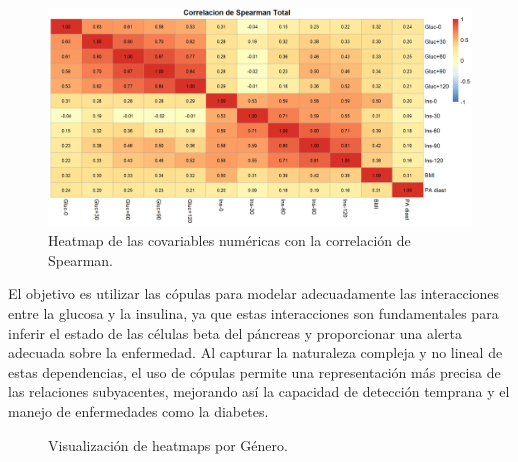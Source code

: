 \begin{figure}[H]
    \centering
    \includegraphics[width = 0.9 \textwidth]{Imagenes/corSperTotal.png}
    \caption{Heatmap de las covariables numéricas con la correlación de Spearman.}
    \label{fig:corSpe}
\end{figure}

El objetivo es utilizar las cópulas para modelar adecuadamente las interacciones entre la glucosa y la insulina, ya que estas interacciones son fundamentales para inferir el estado de las células beta del páncreas y proporcionar una alerta adecuada sobre la enfermedad. Al capturar la naturaleza compleja y no lineal de estas dependencias, el uso de cópulas permite una representación más precisa de las relaciones subyacentes, mejorando así la capacidad de detección temprana y el manejo de enfermedades como la diabetes.


\begin{figure}[H]
 \centering
    \caption{Visualización de heatmaps por Género.}
    \label{fig:CorWolfGen}
\end{figure}

